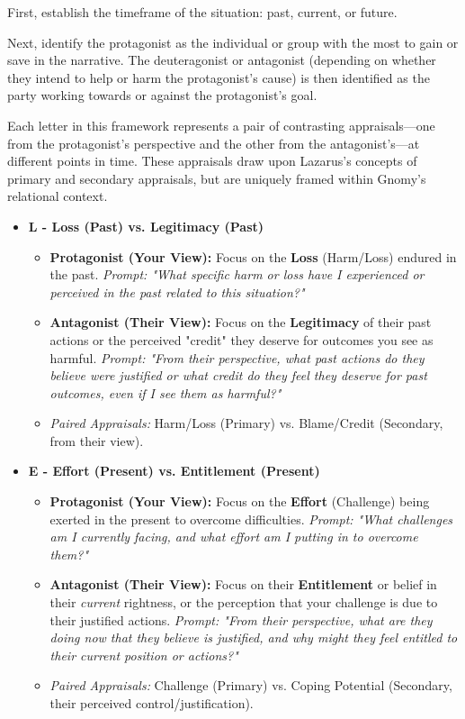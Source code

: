\documentclass{article}
\begin{document}
First, establish the timeframe of the situation: past, current, or future.

Next, identify the protagonist as the individual or group with the most to gain or save in the narrative. The deuteragonist or antagonist (depending on whether they intend to help or harm the protagonist's cause) is then identified as the party working towards or against the protagonist's goal.

Each letter in this framework represents a pair of contrasting appraisals—one from the protagonist's perspective and the other from the antagonist's—at different points in time. These appraisals draw upon Lazarus's concepts of primary and secondary appraisals, but are uniquely framed within Gnomy's relational context.

\begin{itemize}[noitemsep,topsep=0pt]
    \item \textbf{L - Loss (Past) vs. Legitimacy (Past)}
    \begin{itemize}[noitemsep,topsep=0pt]
        \item \textbf{Protagonist (Your View):} Focus on the \textbf{Loss} (Harm/Loss) endured in the past. \textit{Prompt: "What specific harm or loss have I experienced or perceived in the past related to this situation?"}
        \item \textbf{Antagonist (Their View):} Focus on the \textbf{Legitimacy} of their past actions or the perceived "credit" they deserve for outcomes you see as harmful. \textit{Prompt: "From their perspective, what past actions do they believe were justified or what credit do they feel they deserve for past outcomes, even if I see them as harmful?"}
        \item \textit{Paired Appraisals:} Harm/Loss (Primary) vs. Blame/Credit (Secondary, from their view).
    \end{itemize}

    \item \textbf{E - Effort (Present) vs. Entitlement (Present)}
    \begin{itemize}[noitemsep,topsep=0pt]
        \item \textbf{Protagonist (Your View):} Focus on the \textbf{Effort} (Challenge) being exerted in the present to overcome difficulties. \textit{Prompt: "What challenges am I currently facing, and what effort am I putting in to overcome them?"}
        \item \textbf{Antagonist (Their View):} Focus on their \textbf{Entitlement} or belief in their \textit{current} rightness, or the perception that your challenge is due to their justified actions. \textit{Prompt: "From their perspective, what are they doing now that they believe is justified, and why might they feel entitled to their current position or actions?"}
        \item \textit{Paired Appraisals:} Challenge (Primary) vs. Coping Potential (Secondary, their perceived control/justification).
    \end{itemize}


\end{itemize}
\end{document}
